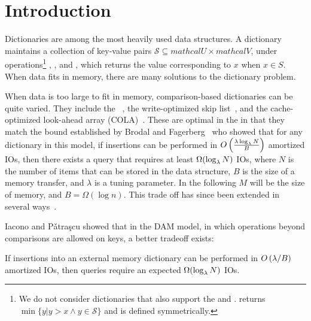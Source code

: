 \section{Introduction}\label{sec:boa-intro}

Dictionaries are among the most heavily used data structures. A
dictionary maintains a collection of key-value pairs
$\mathcal{S}\subseteq mathcal{U}\times mathcal{V}$, under operations\footnote{We do
  not consider dictionaries that also support the  and
  .   returns
  $\min\{y| y>x \land y\in\mathcal{S}\}$ and  is defined
  symmetrically.}  , , and
, which returns the value corresponding to $x$ when
$x\in S$.  When data fits in memory, there are many solutions to the
dictionary problem.

When data is too large to fit in memory, comparison-based dictionaries
can be quite varied.  They include the
\bet~\cite{DBLP:conf/soda/BrodalF03}, the write-optimized skip
list~\cite{DBLP:conf/pods/BenderFJMMPX17}, and the cache-optimized
look-ahead array
(COLA)~\cite{DBLP:conf/spaa/BenderFFFKN07,DBLP:journals/pvldb/BenderFJKKMMSSZ12,DBLP:conf/esa/BenderCDF02}.
These are optimal in the  in
that they match the bound established by Brodal and
Fagerberg~\cite{DBLP:conf/soda/BrodalF03} who showed that for any
dictionary in this model, if insertions can be performed in
$O\left(\frac{\lambda\log_{\lambda} N}{B}\right)$ amortized IOs, then
there exists a query that requires at least $\Omega(\log_\lambda N)$
IOs, where $N$ is the number of items that can be stored in the data
structure, $B$ is the size of a memory transfer, and $\lambda$ is a
tuning parameter.  In the following $M$ will be the size of memory,
and $B = \Omega(\log n)$.  This trade off has since been extended in
several
ways~\cite{DBLP:conf/esa/BenderFGMMT14,DBLP:conf/soda/AfshaniBFFGT17}.

Iacono and P\v{a}tra\c{s}cu showed that in the DAM model, in which
operations beyond comparisons are allowed on keys, a better
tradeoff exists:
\begin{theorem}\label{thm:ip-lower-bound}
  If insertions into an external memory dictionary can be performed in
  $O\left(\lambda/B\right)$ amortized IOs, then queries require an
  expected $\Omega(\log_\lambda N)$ IOs.
\end{theorem}

